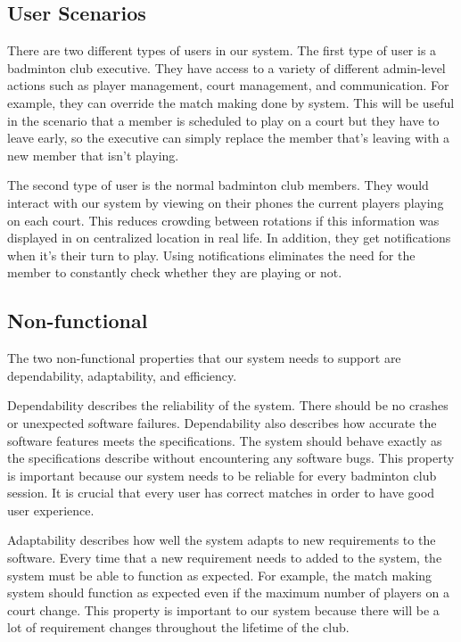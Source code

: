 \documentclass{article}
\begin{document}
\subsection{User Scenarios}
There are two different types of users in our system. The first type of user is
a badminton club executive. They have access to a variety of different admin-level
actions such as player management, court management, and communication.
For example, they can override the match making done by system. This will be useful
in the scenario that a member is scheduled to play on a court but they have to leave
early, so the executive can simply replace the member that's leaving with a new
member that isn't playing.

The second type of user is the normal badminton club members. They would interact
with our system by viewing on their phones the current players playing on each court.
This reduces crowding between rotations if this information was displayed in on
centralized location in real life. In addition, they get notifications when
it's their turn to play. Using notifications eliminates the need for the member
to constantly check whether they are playing or not.

\subsection{Non-functional}
The two non-functional properties that our system needs to support are dependability, adaptability, and efficiency.

Dependability describes the reliability of the system.
There should be no crashes or unexpected software failures.
Dependability also describes how accurate the software features meets the specifications.
The system should behave exactly as the specifications describe without encountering any software bugs.
This property is important because our system needs to be reliable for every badminton club session.
It is crucial that every user has correct matches in order to have good user experience.

Adaptability describes how well the system adapts to new requirements to the software.
Every time that a new requirement needs to added to the system, the system must be able to function as expected.
For example, the match making system should function as expected even if the maximum number of players on a court change.
This property is important to our system because there will be a lot of requirement changes throughout the lifetime of the club.
\end{document}
